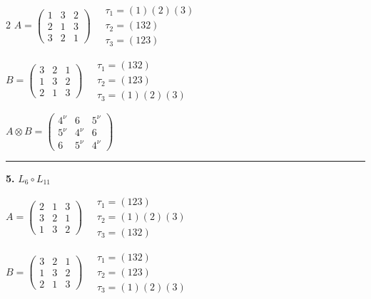 \begin{multicols}{2}
$A = \begin{pmatrix} 1 & 3 & 2 \\ 2 & 1 & 3 \\ 3 & 2 & 1 \end{pmatrix} \quad \begin{matrix} \tau_{1}=(1)(2)(3) \\ \tau_{2}=(1 3 2) \\ \tau_{3}=(1 2 3) \end{matrix}$

$B = \begin{pmatrix} 3 & 2 & 1 \\ 1 & 3 & 2 \\ 2 & 1 & 3 \end{pmatrix} \quad \begin{matrix} \tau_{1}=(1 3 2) \\ \tau_{2}=(1 2 3) \\ \tau_{3}=(1)(2)(3) \end{matrix}$

$A \otimes B = \begin{pmatrix} 4^\nu & 6 & 5^\nu \\ 5^\nu & 4^\nu & 6 \\ 6 & 5^\nu & 4^\nu \end{pmatrix}$

\vspace{0.3em}
\hrule
\vspace{0.3em}

\noindent\textbf{5.} $L_{6} \circ L_{11}$

$A = \begin{pmatrix} 2 & 1 & 3 \\ 3 & 2 & 1 \\ 1 & 3 & 2 \end{pmatrix} \quad \begin{matrix} \tau_{1}=(1 2 3) \\ \tau_{2}=(1)(2)(3) \\ \tau_{3}=(1 3 2) \end{matrix}$

$B = \begin{pmatrix} 3 & 2 & 1 \\ 1 & 3 & 2 \\ 2 & 1 & 3 \end{pmatrix} \quad \begin{matrix} \tau_{1}=(1 3 2) \\ \tau_{2}=(1 2 3) \\ \tau_{3}=(1)(2)(3) \end{matrix}$


\end{multicols}
